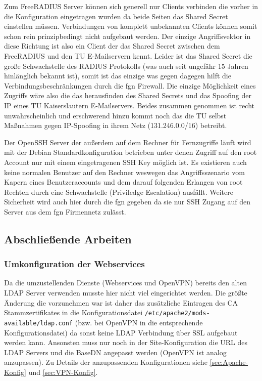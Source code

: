 \documentclass[11pt,a4paper,titlepage=firstiscover]{scrartcl} %
\begin{document}
Zum FreeRADIUS Server können sich generell nur Clients verbinden die vorher in die Konfiguration eingetragen wurden da beide Seiten das Shared Secret einstellen müssen. Verbindungen von komplett unbekannten Clients können somit schon rein prinzipbedingt nicht aufgebaut werden. Der einzige Angriffsvektor in diese Richtung ist also ein Client der das Shared Secret zwischen dem FreeRADIUS und den TU E-Mailservern kennt. Leider ist das Shared Secret die große Schwachstelle des RADIUS Protokolls (was auch seit ungefähr 15 Jahren hinlänglich bekannt ist), somit ist das einzige was gegen dagegen hilft die Verbindungsbeschränkungen durch die fgn Firewall. Die einzige Möglichkeit eines Zugriffs wäre also die das herausfinden des Shared Secrets und das Spoofing der IP eines TU Kaiserslautern E-Mailservers. Beides zusammen genommen ist recht unwahrscheinlich und erschwerend hinzu kommt noch das die TU selbst Maßnahmen gegen IP-Spoofing in ihrem Netz (131.246.0.0/16) betreibt.

Der OpenSSH Server der außerdem auf dem Rechner für Fernzugriffe läuft wird mit der Debian Standardkonfiguration betrieben unter denen Zugriff auf den root Account nur mit einem eingetragenen SSH Key möglich ist. Es existieren auch keine normalen Benutzer auf den Rechner weswegen das Angriffsszenario vom Kapern eines Benutzeraccounts und dem darauf folgenden Erlangen von root Rechten durch eine Schwachstelle (Priviledge Escalation) ausfällt. Weitere Sicherheit wird auch hier durch die fgn gegeben da sie nur SSH Zugang auf den Server aus dem fgn Firmennetz zulässt.

\subsection{Abschließende Arbeiten}
\subsubsection{Umkonfiguration der Webservices}
Da die umzustellenden Dienste (Webservices und OpenVPN) bereits den alten LDAP Server verwenden musste hier nicht viel eingerichtet werden. Die größte Änderung die vorzunehmen war ist daher das zusätzliche Eintragen des CA Stammzertifikates in die Konfigurationsdatei \texttt{/etc/apache2/mods-available/ldap.conf} (bzw. bei OpenVPN in die entsprechende Konfigurationsdatei) da sonst keine LDAP Verbindung über SSL aufgebaut werden kann. Ansonsten muss nur noch in der Site-Konfiguration die URL des LDAP Servers und die BaseDN angepasst werden (OpenVPN ist analog anzupassen). Zu Details der anzupassenden Konfigurationen siehe \autoref{sec:Apache-Konfig} und \autoref{sec:VPN-Konfig}.
\end{document}

